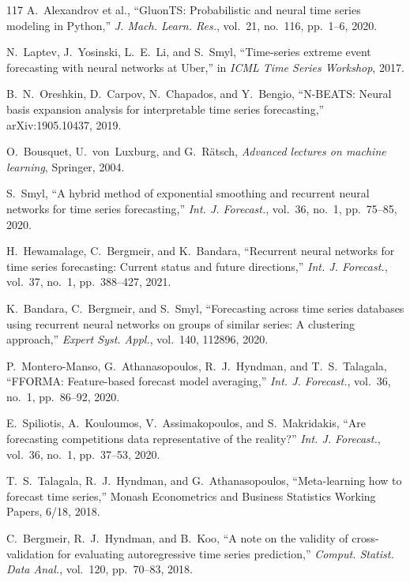 \documentclass[12pt,a4paper]{article}
\begin{document}
\begin{thebibliography}{117}
 A.~Alexandrov et al., ``GluonTS: Probabilistic and neural time series modeling in Python,'' \textit{J. Mach. Learn. Res.}, vol.~21, no.~116, pp.~1--6, 2020.

 N.~Laptev, J.~Yosinski, L.~E.~Li, and S.~Smyl, ``Time-series extreme event forecasting with neural networks at Uber,'' in \textit{ICML Time Series Workshop}, 2017.

 B.~N.~Oreshkin, D.~Carpov, N.~Chapados, and Y.~Bengio, ``N-BEATS: Neural basis expansion analysis for interpretable time series forecasting,'' arXiv:1905.10437, 2019.

 O.~Bousquet, U.~von~Luxburg, and G.~R\"{a}tsch, \textit{Advanced lectures on machine learning}, Springer, 2004.

 S.~Smyl, ``A hybrid method of exponential smoothing and recurrent neural networks for time series forecasting,'' \textit{Int. J. Forecast.}, vol.~36, no.~1, pp.~75--85, 2020.

 H.~Hewamalage, C.~Bergmeir, and K.~Bandara, ``Recurrent neural networks for time series forecasting: Current status and future directions,'' \textit{Int. J. Forecast.}, vol.~37, no.~1, pp.~388--427, 2021.

 K.~Bandara, C.~Bergmeir, and S.~Smyl, ``Forecasting across time series databases using recurrent neural networks on groups of similar series: A clustering approach,'' \textit{Expert Syst. Appl.}, vol.~140, 112896, 2020.

 P.~Montero-Manso, G.~Athanasopoulos, R.~J.~Hyndman, and T.~S.~Talagala, ``FFORMA: Feature-based forecast model averaging,'' \textit{Int. J. Forecast.}, vol.~36, no.~1, pp.~86--92, 2020.

 E.~Spiliotis, A.~Kouloumos, V.~Assimakopoulos, and S.~Makridakis, ``Are forecasting competitions data representative of the reality?'' \textit{Int. J. Forecast.}, vol.~36, no.~1, pp.~37--53, 2020.

 T.~S.~Talagala, R.~J.~Hyndman, and G.~Athanasopoulos, ``Meta-learning how to forecast time series,'' Monash Econometrics and Business Statistics Working Papers, 6/18, 2018.

 C.~Bergmeir, R.~J.~Hyndman, and B.~Koo, ``A note on the validity of cross-validation for evaluating autoregressive time series prediction,'' \textit{Comput. Statist. Data Anal.}, vol.~120, pp.~70--83, 2018.


\end{thebibliography}
\end{document}

